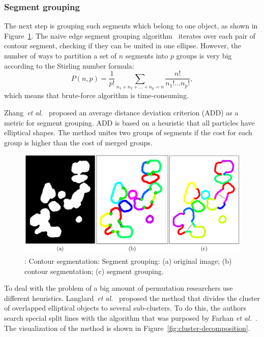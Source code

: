 \documentclass{lutmscthesis}[2010/09/22]
\begin{document}
\subsubsection{Segment grouping}
The next step is grouping such segments which belong to one object, as shown in Figure~\ref{fig:Segment-grouping}. 
The naive edge segment grouping algorithm~\cite{bubble} iterates over each pair of contour segment, checking if they can be united in one ellipse. However, the number of ways to partition a set of $n$ segments into $p$ groups is very big according to the Stirling number formula:
\begin{equation}
    P(n,p) = \frac{1}{p!}\sum_{n_1+n_2+...+n_p=n}\frac{n!}{n_1!...n_p!},
\end{equation}
which means that brute-force algorithm is time-consuming.

Zhang~\emph{et al.}~\cite{bubble} proposed an average distance deviation criterion (ADD) as a metric for segment grouping. ADD is based on a heuristic that all particles have elliptical shapes. The method unites two groups of segments if the cost for each group is higher than the cost of merged groups.
\begin{figure} [ht]
  \includegraphics[width=\linewidth, scale=0.5]{segment-grouping.png}
  \caption{: Contour segmentation: 
    Segment grouping: 
    (a) original image; 
    (b) contour segmentation;
    (c) segment grouping.~\cite{Zafari15}}
  \label{fig:Segment-grouping}
\end{figure}


To deal with the problem of a big amount of permutation researchers use different heuristics. Langlard~\emph{et al.}~\cite{LANGLARD2018} proposed the method that divides the cluster of overlapped elliptical objects to several sub-clusters. To do this, the authors search special split lines with the algorithm that was purposed by Farhan \emph{et al.}~\cite{farhan}. The visualization of the method is shown in Figure~\ref{fig:cluster-decomposition}.
\end{document}
